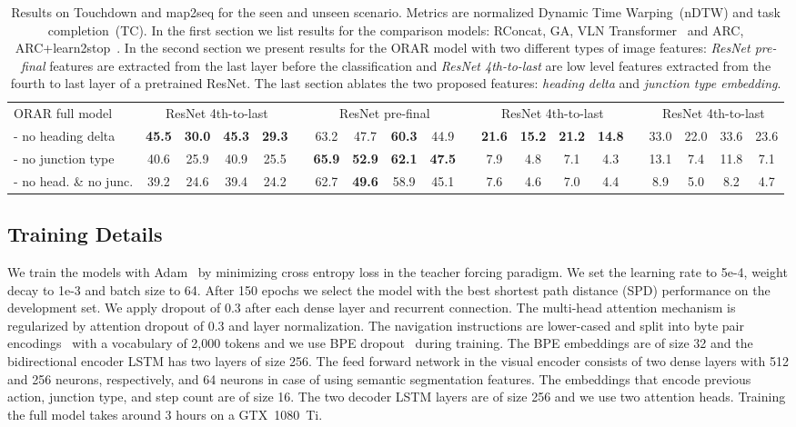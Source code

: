 \documentclass[11pt]{article}
\begin{document}
\begin{table*}[]
{\begin{tabular}{@{}lc@{}cc@{}clc@{}cc@{}clc@{}cc@{}clc@{}cc@{}c@{}}
\midrule
ORAR full model&\multicolumn{4}{c}{ ResNet 4th-to-last} & \phantom{} & \multicolumn{4}{c}{ ResNet pre-final} & \phantom{} & \multicolumn{4}{c}{ ResNet 4th-to-last} & \phantom{} & \multicolumn{4}{c}{ ResNet 4th-to-last} \\
- no heading delta & \textbf{45.5} & \textbf{30.0} & \textbf{45.3} & \textbf{29.3} && 63.2 & 47.7 & \textbf{60.3} & 44.9 && \textbf{21.6} & \textbf{15.2} & \textbf{21.2} & \textbf{14.8} && 33.0 & 22.0 & 33.6 & 23.6 \\
- no junction type & 40.6 & 25.9 & 40.9 & 25.5 && \textbf{65.9} & \textbf{52.9} & \textbf{62.1} & \textbf{47.5} && 7.9 & 4.8 & 7.1 & 4.3 && 13.1 & 7.4 & 11.8 & 7.1 \\
- no head. \& no junc. & 39.2 & 24.6 & 39.4 & 24.2 && 62.7 & \textbf{49.6} & 58.9 & 45.1 && 7.6 & 4.6 & 7.0 & 4.4 && 8.9 & 5.0 & 8.2 & 4.7 \\
\bottomrule
\end{tabular}
}
\caption{Results on Touchdown and map2seq for the seen and unseen scenario. Metrics are normalized Dynamic Time Warping~(nDTW) and task completion~(TC). In the first section we list results for the comparison models: RConcat, GA, VLN Transformer~\cite{Zhu2020MultimodalNavigation} and ARC, ARC+learn2stop~\cite{Xiang2020LearningNavigation}. In the second section we present results for the ORAR model with two different types of image features: \textit{ResNet pre-final} features are extracted from the last layer before the classification and \textit{ResNet 4th-to-last} are low level features extracted from the fourth to last layer of a pretrained ResNet. The last section ablates the two proposed features: \textit{heading delta} and \textit{junction type embedding}.}
\label{tab:results}
\end{table*}

 \subsection{Training Details}
We train the models with Adam~\cite{adam} by minimizing cross entropy loss in the teacher forcing paradigm. We set the learning rate to 5e-4, weight decay to 1e-3 and batch size to 64. After 150 epochs we select the model with the best shortest path distance (SPD) performance on the development set. We apply dropout of 0.3 after each dense layer and recurrent connection. The multi-head attention mechanism is regularized by attention dropout of 0.3 and layer normalization. The navigation instructions are lower-cased and split into byte pair encodings~\cite{bpe} with a vocabulary of 2,000 tokens and we use BPE dropout~\cite{bpe_dropout} during training. The BPE embeddings are of size 32 and the bidirectional encoder LSTM has two layers of size 256. The feed forward network in the visual encoder consists of two dense layers with 512 and 256 neurons, respectively, and 64 neurons in case of using semantic segmentation features. The embeddings that encode previous action, junction type, and step count are of size 16. The two decoder LSTM layers are of size 256 and we use two attention heads. Training the full model takes around 3 hours on a GTX~1080~Ti.
\end{document}

